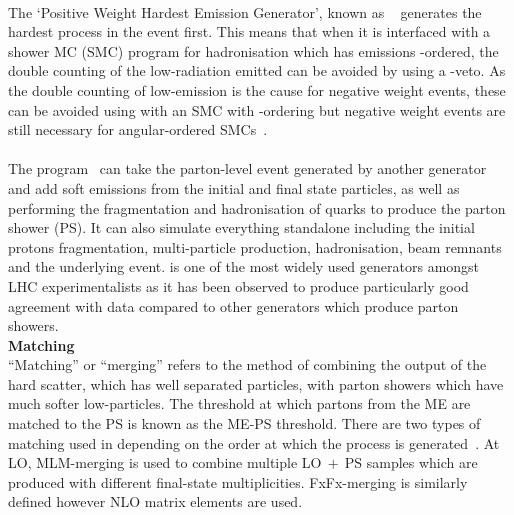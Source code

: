 \textbf{\POWHEG}\\
The `Positive Weight Hardest Emission Generator', known as \POWHEG~\cite{POWHEG} generates the hardest process in the event first. This means that when it is interfaced with a shower MC (SMC) program for hadronisation which has emissions \pt-ordered, the double counting of the low-\pt radiation emitted can be avoided by using a \pt-veto. As the double counting of low-\pt emission is the cause for negative weight events, these can be avoided using \POWHEG with an SMC with \pt-ordering but negative weight events are still necessary for angular-ordered SMCs~\cite{Oleari:2010nx}. \\


\textbf{\PYTHIA}\\
The \PYTHIA program~\cite{pythia} can take the parton-level event generated by another generator and add soft emissions from the initial and final state particles, as well as performing the fragmentation and hadronisation of quarks to produce the parton shower (PS). It can also simulate everything standalone including the initial protons fragmentation, multi-particle production, hadronisation, beam remnants and the underlying event. \PYTHIA is one of the most widely used generators amongst LHC experimentalists as it has been observed to produce particularly good agreement with data compared to other generators which produce parton showers.\\



\textbf{Matching}\\
``Matching'' or ``merging'' refers to the method of combining the output of the hard scatter, which has well separated particles, with parton showers which have much softer low-\pt particles. The \pt threshold at which partons from the ME are matched to the PS is known as the ME-PS threshold.
There are two types of matching used in \MADGRAPH depending on the order at which the process is generated~\cite{Degrande:2014sta}. At LO, MLM-merging is used to combine multiple LO$~+~$PS samples which are produced with different final-state multiplicities. FxFx-merging is similarly defined however NLO matrix elements are used.\\
